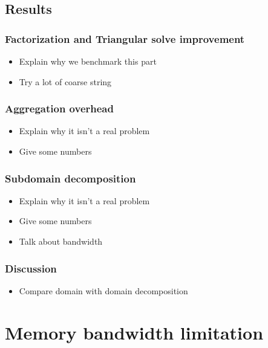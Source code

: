\documentclass[oneside,12t]{classes/Thesis}
\begin{document}
\section{Results}
\subsection{Factorization and Triangular solve improvement}
  \begin{itemize}
    \item Explain why we benchmark this part
    \item Try a lot of coarse string
  \end{itemize}
\subsection{Aggregation overhead}
  \begin{itemize}
    \item Explain why it isn't a real problem
    \item Give some numbers
  \end{itemize}
\subsection{Subdomain decomposition}
  \begin{itemize}
    \item Explain why it isn't a real problem
    \item Give some numbers
    \item Talk about bandwidth
  \end{itemize}
\subsection{Discussion}
  \begin{itemize}
    \item Compare domain with domain decomposition
  \end{itemize}





\chapter{Memory bandwidth limitation}
\minitoc
\vspace{1cm}


\end{document}

